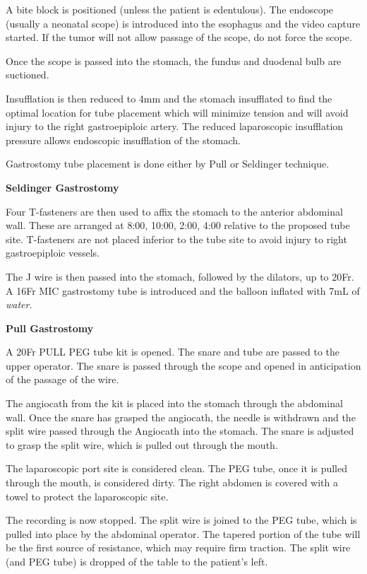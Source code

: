 \documentclass[
  letterpaper,
]{scrbook}
\begin{document}
A bite block is positioned (unless the patient is edentulous). The
endoscope (usually a neonatal scope) is introduced into the esophagus
and the video capture started. If the tumor will not allow passage of
the scope, do not force the scope.

Once the scope is passed into the stomach, the fundus and duodenal bulb
are suctioned.

Insufflation is then reduced to 4mm and the stomach insufflated to find
the optimal location for tube placement which will minimize tension and
will avoid injury to the right gastroepiploic artery. The reduced
laparoscopic insufflation pressure allows endoscopic insufflation of the
stomach.

Gastrostomy tube placement is done either by Pull or Seldinger
technique.

\textbf{Seldinger Gastrostomy}

Four T-fasteners are then used to affix the stomach to the anterior
abdominal wall. These are arranged at 8:00, 10:00, 2:00, 4:00 relative
to the proposed tube site. T-fasteners are not placed inferior to the
tube site to avoid injury to right gastroepiploic vessels.

The J wire is then passed into the stomach, followed by the dilators, up
to 20Fr. A 16Fr MIC gastrostomy tube is introduced and the balloon
inflated with 7mL of \emph{water}.

\textbf{Pull Gastrostomy}

A 20Fr PULL PEG tube kit is opened. The snare and tube are passed to the
upper operator. The snare is passed through the scope and opened in
anticipation of the passage of the wire.

The angiocath from the kit is placed into the stomach through the
abdominal wall. Once the snare has grasped the angiocath, the needle is
withdrawn and the split wire passed through the Angiocath into the
stomach. The snare is adjusted to grasp the split wire, which is pulled
out through the mouth.

The laparoscopic port site is considered clean. The PEG tube, once it is
pulled through the mouth, is considered dirty. The right abdomen is
covered with a towel to protect the laparoscopic site.

The recording is now stopped. The split wire is joined to the PEG tube,
which is pulled into place by the abdominal operator. The tapered
portion of the tube will be the first source of resistance, which may
require firm traction. The split wire (and PEG tube) is dropped of the
table to the patient's left.
\end{document}
